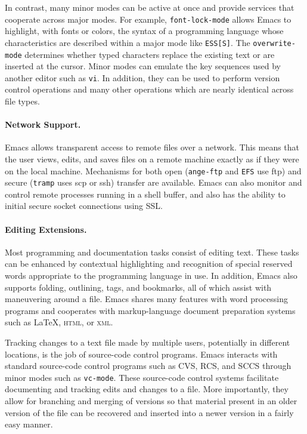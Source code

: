 \documentclass{article}
\newcommand{\stexttt}[1]{{\small\texttt{#1}}}
\begin{document}
In contrast, many minor modes can be active at once and provide
services that cooperate across major modes.  For example,
\stexttt{font-lock-mode} allows Emacs to highlight, with fonts or
colors, the syntax of a programming language whose characteristics are
described within a major mode like \stexttt{ESS[S]}.  The
\stexttt{overwrite-mode} determines whether typed characters replace
the existing text or are inserted at the cursor.  Minor modes can
emulate the key sequences used by another editor such as \stexttt{vi}.
In addition, they can be used to perform version control operations
and many other operations which are nearly identical across file
types.

\paragraph{Network Support.}
Emacs allows transparent access to remote files over a network.  This
means that the user views, edits, and saves files on a remote machine
exactly as if they were on the local machine.  Mechanisms for both
open (\stexttt{ange-ftp} and \stexttt{EFS} use ftp) and secure
(\stexttt{tramp} uses scp or ssh) transfer are available.  Emacs can
also monitor and control remote processes running in a shell buffer,
and also has the ability to initial secure socket connections using
SSL.

\paragraph{Editing Extensions.}
Most programming and documentation tasks consist of editing text.
These tasks can be enhanced by contextual highlighting and recognition
of special reserved words appropriate to the programming language in
use.  In addition, Emacs also supports folding, outlining, tags, and
bookmarks, all of which assist with maneuvering around a file.  Emacs
shares many features with word processing programs and cooperates with
markup-language document preparation systems such as \LaTeX,
\textsc{html}, or \textsc{xml}.

Tracking changes to a text file made by multiple users, potentially in 
different locations, is the job of source-code control programs.
Emacs interacts with standard source-code control programs such as CVS, RCS,
and SCCS through minor modes such as \stexttt{vc-mode}.  These
source-code control systems facilitate documenting and tracking edits and
changes to a file.  More importantly, they allow for branching and
merging of versions so that material present in an older version of
the file can be recovered and inserted into a newer version in a
fairly easy manner.
\end{document}
